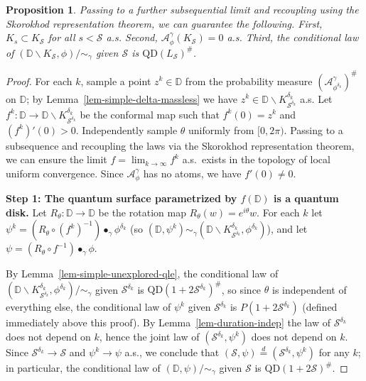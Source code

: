 \documentclass[a4paper]{article}
\numberwithin{equation}{section}
\newcommand{\D}{\mathbb{D}}
\newcommand{\cA}{\mathcal{A}}
\newcommand{\qduration}{\mathcal{S}}
\newcommand{\QD}{\mathrm{QD}}
\newtheorem{proposition}[theorem]{Proposition}
\theoremstyle{remark}
\numberwithin{equation}{section}
\begin{document}
\begin{proposition}\label{prop-simple-markov}
Passing to a further subsequential limit and recoupling using the Skorokhod representation theorem, we can guarantee the following. First, $K_s \subset K_\qduration$ for all $s < \qduration$ a.s. Second, $\cA^\gamma_\phi(K_\qduration) = 0$ a.s. Third, the conditional law of $(\D \backslash K_\qduration, \phi)/{\sim_\gamma}$ given $\qduration$ is $\QD(L_\qduration)^\#$.
\end{proposition}
\begin{proof}
\noindent
    For each $k$, sample a point $z^k \in \D$ from the probability measure $(\cA^\gamma_{\phi^{\delta_k}})^\#$ on $\D$; by Lemma~\ref{lem-simple-delta-massless} we have $z^k \in \D \backslash K^{\delta_k}_{\qduration^{\delta_k}}$ a.s. Let $f^k: \D \to \D \backslash K^{\delta_k}_{\qduration^{\delta_k}}$ be the conformal map such that $f^k(0) = z^k$ and $(f^k)'(0) > 0$. Independently sample $\theta$ uniformly from $[0,2\pi)$. 
    Passing to a subsequence and recoupling the laws via the Skorokhod representation theorem, we can ensure the limit $f = \lim_{k \to \infty} f^k$ a.s.\ exists in the topology of local uniform convergence. Since $\cA^\gamma_\phi$ has no atoms, we have $f'(0) \neq 0$. 
    \medskip 

    \noindent 
    \textbf{Step 1: The quantum surface parametrized by $f(\D)$ is a quantum disk.} 
   Let $R_\theta: \D \to \D$ be the rotation map $R_\theta(w) = e^{i\theta}w$. For each $k$ let $\psi^k = (R_{\theta} \circ (f^k)^{-1}) \bullet_\gamma \phi^{\delta_k}$ (so $(\D, \psi^k) \sim_\gamma (\D \backslash K^{\delta_k}_{\qduration^{\delta_k}}, \phi^{\delta_k})$), and let $\psi = (R_{\theta} \circ f^{-1}) \bullet_\gamma \phi$.

    By Lemma~\ref{lem-simple-unexplored-qle}, the conditional law of $(\D \backslash K^{\delta_k}_{\qduration^{\delta_k}}, \phi^{\delta_k})/{\sim_\gamma}$ given $\qduration^{\delta_k}$ is $\QD(1 + 2 \qduration^{\delta_k})^\#$, so since $\theta$ is independent of everything else, the conditional law of $\psi^k$ given $\qduration^{\delta_k}$ is $P(1 + 2 \qduration^{\delta_k})$ (defined immediately above this proof). 
    By Lemma~\ref{lem-duration-indep} the law of $\qduration^{\delta_k}$ does not depend on $k$, hence the joint law of $(\qduration^{\delta_k}, \psi^k)$ does not depend on $k$. Since $\qduration^{\delta_k} \to \qduration$ and $\psi^k \to \psi$ a.s., we conclude that $(\qduration, \psi) \stackrel d= (\qduration^{\delta_k}, \psi^k)$ for any $k$; in particular, the conditional law of $(\D, \psi)/{\sim_\gamma}$ given $\qduration$ is $\QD(1+2\qduration)^\#$. 


\end{proof}
\end{document}

